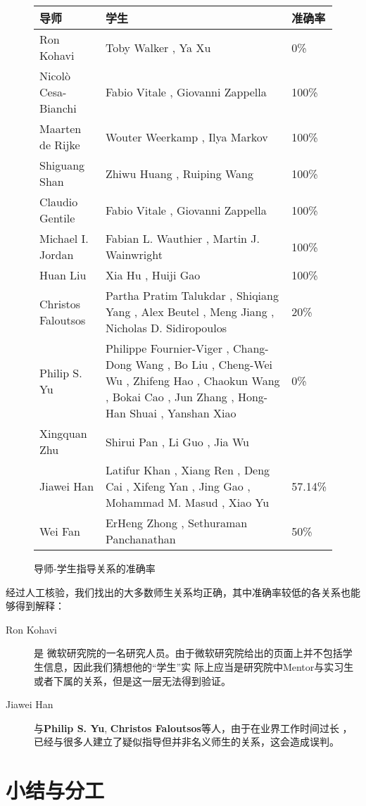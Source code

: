 \documentclass[a4paper]{article}
\begin{document}
\begin{figure}[ht]
  \begin{center}
    \begin{tabular}{lm{9cm}l}
      \hline
      导师 & 学生 & 准确率 \\
      \hline
      Ron Kohavi & Toby Walker , Ya Xu  & 0\%\\
      Nicolò Cesa-Bianchi & Fabio Vitale , Giovanni Zappella  & 100\%\\
      Maarten de Rijke & Wouter Weerkamp , Ilya Markov  & 100\%\\
      Shiguang Shan & Zhiwu Huang , Ruiping Wang  & 100\%\\
      Claudio Gentile & Fabio Vitale , Giovanni Zappella  & 100\%\\
      Michael I. Jordan & Fabian L. Wauthier , Martin J. Wainwright  & 100\% \\
      Huan Liu & Xia Hu , Huiji Gao  & 100\%\\
      Christos Faloutsos & Partha Pratim Talukdar , Shiqiang Yang , Alex Beutel , Meng Jiang , Nicholas D.
      Sidiropoulos  & 20\%\\
      Philip S. Yu & Philippe Fournier-Viger , Chang-Dong Wang , Bo Liu , Cheng-Wei Wu , Zhifeng Hao ,
      Chaokun Wang , Bokai Cao , Jun Zhang , Hong-Han Shuai , Yanshan Xiao  & 0\%\\
      Xingquan Zhu & Shirui Pan , Li Guo , Jia Wu  & \\
      Jiawei Han & Latifur Khan , Xiang Ren , Deng Cai , Xifeng Yan , Jing Gao , Mohammad M. Masud , Xiao
      Yu  & 57.14\%\\
      Wei Fan & ErHeng Zhong , Sethuraman Panchanathan  & 50\%\\
      \hline
    \end{tabular}
  \end{center}
  \caption{导师-学生指导关系的准确率}
  \label{supervising}
\end{figure}

经过人工核验，我们找出的大多数师生关系均正确，其中准确率较低的各关系也能够得到解释：
\begin{description}
  \item[Ron Kohavi] 是
    微软研究院的一名研究人员。由于微软研究院给出的页面上并不包括学生信息，因此我们猜想他的``学生''实
    际上应当是研究院中Mentor与实习生或者下属的关系，但是这一层无法得到验证。
  \item[Jiawei Han] 与\textbf{Philip S. Yu}, \textbf{Christos Faloutsos}等人，由于在业界工作时间过长
    ，已经与很多人建立了疑似指导但并非名义师生的关系，这会造成误判。
\end{description}

\section{小结与分工}
\end{document}
